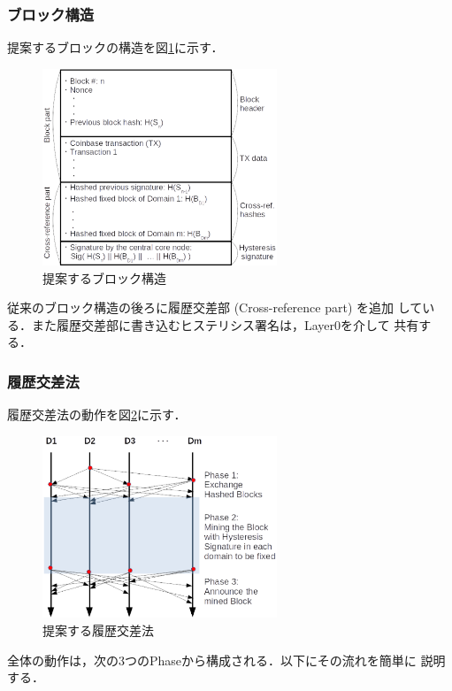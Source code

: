 \documentclass[a4paper,12pt]{jsarticle}
\begin{document}
\subsubsection{ブロック構造}
提案するブロックの構造を図\ref{fig:block}に示す．
%
\begin{figure}[h]
  \begin{center}
    \includegraphics[width=70mm]{pht/block_structure.eps}
  \end{center}
  \caption{提案するブロック構造}
  \label{fig:block}
\end{figure}
%
従来のブロック構造の後ろに履歴交差部 (Cross-reference part) を追加
している．また履歴交差部に書き込むヒステリシス署名は，Layer0を介して
共有する．

\subsubsection{履歴交差法}
履歴交差法の動作を図\ref{fig:cross-ref}に示す．
%
\begin{figure}[h]
  \begin{center}
    \includegraphics[width=70mm]{pht/time_sequence-algorithm1.eps}
  \end{center}
  \caption{提案する履歴交差法}
  \label{fig:cross-ref}
\end{figure}
%
全体の動作は，次の3つのPhaseから構成される．以下にその流れを簡単に
説明する．
\end{document}
